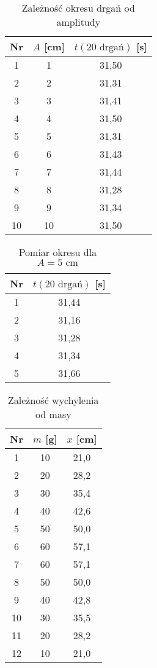 \documentclass[a4paper,12pt]{article}
\begin{document}
\begin{table}[H]
    \centering
    \begin{tabular}{|c|c|c|}
        \hline
        Nr & $A$ [cm] & $t(20 \text{ drgań})$ [s] \\
        \hline
        1  & 1 & 31,50 \\
        2  & 2 & 31,31 \\
        3  & 3 & 31,41 \\
        4  & 4 & 31,50 \\
        5  & 5 & 31,31 \\
        6  & 6 & 31,43 \\
        7  & 7 & 31,44 \\
        8  & 8 & 31,28 \\
        9  & 9 & 31,34 \\
        10 & 10 & 31,50 \\
        \hline
    \end{tabular}
    \caption{Zależność okresu drgań od amplitudy}
\end{table}

\begin{table}[H]
    \centering
    \begin{tabular}{|c|c|}
        \hline
        Nr & $t(20 \text{ drgań})$ [s] \\
        \hline
        1 & 31,44 \\
        2 & 31,16 \\
        3 & 31,28 \\
        4 & 31,34 \\
        5 & 31,66 \\
        \hline
    \end{tabular}
    \caption{Pomiar okresu dla $A = 5 \text{ cm}$}
\end{table}

\begin{table}[H]
    \centering
    \begin{tabular}{|c|c|c|}
        \hline
        Nr & $m$ [g] & $x$ [cm] \\
        \hline
        1  & 10  & 21,0 \\
        2  & 20  & 28,2 \\
        3  & 30  & 35,4 \\
        4  & 40  & 42,6 \\
        5  & 50  & 50,0 \\
        6  & 60  & 57,1 \\
        \hline
        7  & 60  & 57,1 \\
        8  & 50  & 50,0 \\
        9  & 40  & 42,8 \\
        10 & 30  & 35,5 \\
        11 & 20  & 28,2 \\
        12 & 10  & 21,0 \\
        \hline
    \end{tabular}
    \caption{Zależność wychylenia od masy}
\end{table}
\end{document}
